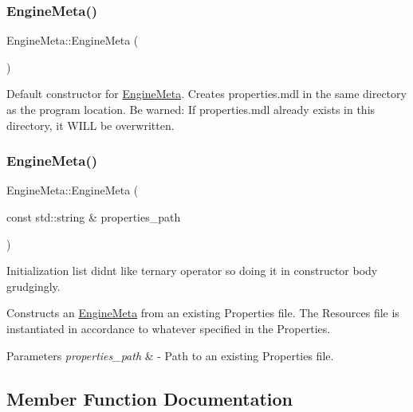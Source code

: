 \subsubsection{\texorpdfstring{Engine\+Meta()}{EngineMeta()}\hspace{0.1cm}{\footnotesize\ttfamily [1/2]}}
{\footnotesize\ttfamily Engine\+Meta\+::\+Engine\+Meta (\begin{DoxyParamCaption}{ }\end{DoxyParamCaption})}

Default constructor for \mbox{\hyperlink{class_engine_meta}{Engine\+Meta}}. Creates \textquotesingle{}properties.\+mdl\textquotesingle{} in the same directory as the program location. Be warned\+: If \textquotesingle{}properties.\+mdl\textquotesingle{} already exists in this directory, it W\+I\+LL be overwritten. \mbox{\label{class_engine_meta_aead57aabdb172dd359bd34dc99c1c37e}} 
\subsubsection{\texorpdfstring{Engine\+Meta()}{EngineMeta()}\hspace{0.1cm}{\footnotesize\ttfamily [2/2]}}
{\footnotesize\ttfamily Engine\+Meta\+::\+Engine\+Meta (\begin{DoxyParamCaption}\item[{const std\+::string \&}]{properties\+\_\+path }\end{DoxyParamCaption})}



Initialization list didn\textquotesingle{}t like ternary operator so doing it in constructor body grudgingly. 

Constructs an \mbox{\hyperlink{class_engine_meta}{Engine\+Meta}} from an existing Properties file. The Resources file is instantiated in accordance to whatever specified in the Properties. 
\begin{DoxyParams}{Parameters}
{\em properties\+\_\+path} & -\/ Path to an existing Properties file. \\
\hline
\end{DoxyParams}


\subsection{Member Function Documentation}
\mbox{\label{class_engine_meta_a3834c2a1d2fb9a957ac856dd50f33cd4}} 
